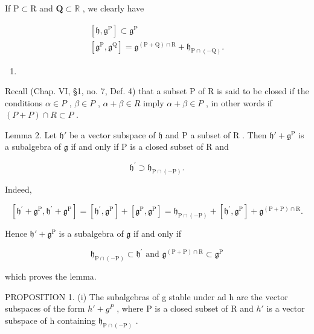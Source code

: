 If \(\mathrm{P}\subset \mathrm{R}\) and \(\mathbf{Q}\subset \mathbb{R}\) , we clearly have

\[
\begin{array}{c} {[ \mathfrak {h}, \mathfrak {g} ^ {\mathrm{P}} ] \subset \mathfrak {g} ^ {\mathrm{P}}} \\ {[ \mathfrak {g} ^ {\mathrm{P}}, \mathfrak {g} ^ {\mathrm{Q}} ] = \mathfrak {g} ^ {(\mathrm{P+Q}) \cap \mathrm{R}} + \mathfrak {h} _ {\mathrm{P} \cap (- \mathrm{Q})}.} \end{array}\tag{1}
\]

\begin{enumerate}
\def\labelenumi{(\arabic{enumi})}
\setcounter{enumi}{1}
\tightlist
\item
\end{enumerate}

Recall (Chap. VI, §1, no. 7, Def. 4) that a subset P of R is said to be closed if the conditions \(\alpha \in P\) , \(\beta \in P\) , \(\alpha + \beta \in R\) imply \(\alpha + \beta \in P\) , in other words if \((P + P) \cap R \subset P\) .

Lemma 2. Let \(\mathfrak{h}'\) be a vector subspace of \(\mathfrak{h}\) and \(\mathrm{P}\) a subset of \(\mathrm{R}\) . Then \(\mathfrak{h}' + \mathfrak{g}^{\mathrm{P}}\) is a subalgebra of \(\mathfrak{g}\) if and only if \(\mathrm{P}\) is a closed subset of \(\mathrm{R}\) and

\[
\mathfrak {h} ^ {\prime} \supset \mathfrak {h} _ {\mathrm{P} \cap (- \mathrm{P})}.
\]

Indeed,

\[
[ \mathfrak {h} ^ {\prime} + \mathfrak {g} ^ {\mathrm{P}}, \mathfrak {h} ^ {\prime} + \mathfrak {g} ^ {\mathrm{P}} ] = [ \mathfrak {h} ^ {\prime}, \mathfrak {g} ^ {\mathrm{P}} ] + [ \mathfrak {g} ^ {\mathrm{P}}, \mathfrak {g} ^ {\mathrm{P}} ] = \mathfrak {h} _ {\mathrm{P} \cap (- \mathrm{P})} + [ \mathfrak {h} ^ {\prime}, \mathfrak {g} ^ {\mathrm{P}} ] + \mathfrak {g} ^ {(\mathrm{P} + \mathrm{P}) \cap \mathrm{R}}.
\]

Hence \(\mathfrak{h}' + \mathfrak{g}^{\mathrm{P}}\) is a subalgebra of \(\mathfrak{g}\) if and only if

\[
\mathfrak {h} _ {\mathrm{P} \cap (- \mathrm{P})} \subset \mathfrak {h} ^ {\prime} \text { and } \mathfrak {g} ^ {(\mathrm{P} + \mathrm{P}) \cap \mathrm{R}} \subset \mathfrak {g} ^ {\mathrm{P}}
\]

which proves the lemma.

PROPOSITION 1. (i) The subalgebras of g stable under ad h are the vector subspaces of the form \(h' + g^{P}\) , where P is a closed subset of R and \(h'\) is a vector subspace of h containing \(\mathfrak{h}_{\mathrm{P}\cap(-\mathrm{P})}\) .

